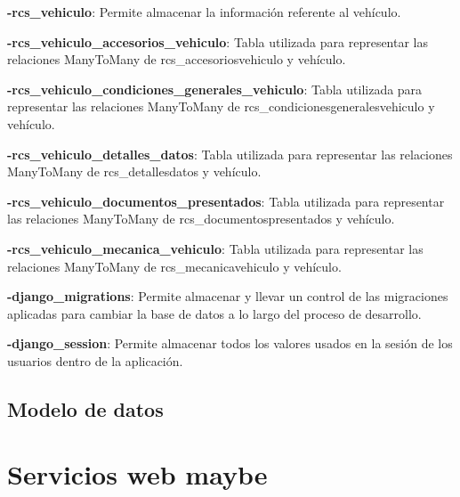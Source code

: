 \textbf{-rcs\_vehiculo}: Permite almacenar la información referente al vehículo.

\textbf{-rcs\_vehiculo\_accesorios\_vehiculo}: Tabla utilizada para representar las relaciones ManyToMany de rcs\_accesoriosvehiculo y vehículo.

\textbf{-rcs\_vehiculo\_condiciones\_generales\_vehiculo}: Tabla utilizada para representar las relaciones ManyToMany de rcs\_condicionesgeneralesvehiculo y vehículo.

\textbf{-rcs\_vehiculo\_detalles\_datos}: Tabla utilizada para representar las relaciones ManyToMany de rcs\_detallesdatos y vehículo.

\textbf{-rcs\_vehiculo\_documentos\_presentados}: Tabla utilizada para representar las relaciones ManyToMany de rcs\_documentospresentados y vehículo.

\textbf{-rcs\_vehiculo\_mecanica\_vehiculo}: Tabla utilizada para representar las relaciones ManyToMany de rcs\_mecanicavehiculo y vehículo.

\textbf{-django\_migrations}: Permite almacenar y llevar un control de las migraciones aplicadas para cambiar la base de datos a lo largo del proceso de desarrollo.

\textbf{-django\_session}: Permite almacenar todos los valores usados en la sesión de los usuarios dentro de la aplicación.


\setlength{\parskip}{0mm}





\subsection{Modelo de datos}
\setlength{\parskip}{5mm}
\setlength{\parskip}{0mm}


\section{Servicios web maybe} 
\setlength{\parskip}{5mm}
\setlength{\parskip}{0mm}

